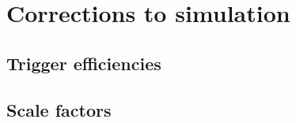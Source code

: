 \section{Corrections to simulation} %



\subsection{Trigger efficiencies}


\subsection{Scale factors}


